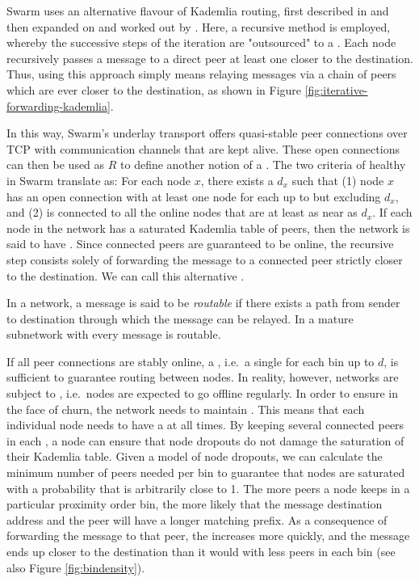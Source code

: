 Swarm uses an alternative flavour of Kademlia routing, first described in \citet{heep2010r} and then expanded on and worked out by \citet{tronetal2019-network}. Here, a recursive method is employed, whereby the successive steps of the iteration are "outsourced" to a .
Each node recursively passes a message to a direct peer at least one  closer to the destination. Thus,  using this approach simply means relaying messages via a chain of peers which are ever closer to the destination, as shown in Figure \ref{fig:iterative-forwarding-kademlia}.


In this way, Swarm's underlay transport offers quasi-stable peer connections over TCP with communication channels that are kept alive. These open connections can then be used as $R$ to define another notion of a . The two criteria of healthy  in Swarm translate as: For each node $x$, there exists a  $d_x$ such that (1) node $x$ has an open connection with at least one node for each  up to but excluding $d_x$, and (2) is connected to all the online nodes that are at least as near as $d_x$. If each node in the network has a saturated Kademlia table of peers, then the network is said to have . Since connected peers are guaranteed to be online, the recursive step consists solely of forwarding the message to a connected peer strictly closer to the destination. We can call this alternative .


In a  network, a message is said to be \emph{routable} if there exists a path from sender to destination through which the message can be relayed. In a mature subnetwork with  every message is routable. 

If all peer connections are stably online, a , i.e.\ a single  for each bin up to $d$, is sufficient to guarantee routing between nodes. In reality, however, networks are subject to , i.e.\ nodes are expected to go offline regularly. In order to ensure  in the face of churn, the network needs to maintain . This means that each individual node needs to have a  at all times. By keeping several connected peers in each , a node can ensure that node dropouts do not damage the saturation of their Kademlia table. Given a model of node dropouts, we can calculate the minimum number of peers needed per bin to guarantee that nodes are saturated with a probability that is arbitrarily close to 1. The more peers a node keeps in a particular proximity order bin, the more likely that the message destination address and the peer will have a longer matching prefix. As a consequence of forwarding the message to that peer, the  increases more quickly, and the message ends up closer to the destination than it would with less peers in each bin (see also Figure \ref{fig:bindensity}).



